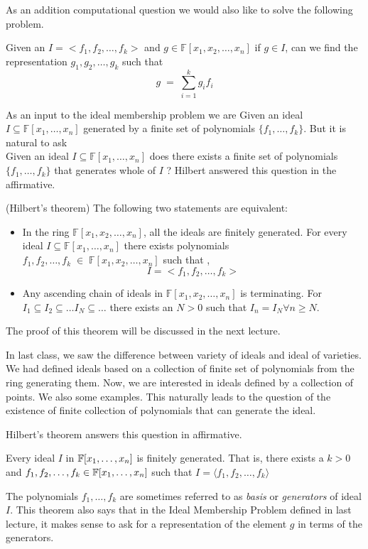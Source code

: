 As an addition computational question we would also like to solve the following problem.


Given an $I = <f_1,f_2, \ldots, f_k>$ and $g \in \mathbb{F}[x_1,x_2,\ldots,x_n]$ if $g\in I$, can we find the representation $g_1,g_2,\ldots,g_k$ such that $$
	g\;=\;\sum_{i=1}^k g_if_i
$$

As an input to the ideal membership problem we are 
Given an ideal $I\subseteq\mathbb{F}[x_1,\ldots,x_n]$ generated by a finite set of polynomials $\{f_1,\ldots,f_k\}$. But it is natural to ask \\
Given an ideal $I\subseteq\mathbb{F}[x_1,\ldots,x_n]$ does there exists a finite set of polynomials $\{f_1,\ldots,f_k\}$ that generates whole of $I$ ? Hilbert answered this question in the affirmative.


\begin{theorem}(Hilbert's theorem)  \label{thm:ascending-chain-condition}
The following two statements are equivalent:
\begin{itemize}
\item In the ring $\mathbb{F}[x_1,x_2,\ldots,x_n]$, all the ideals are finitely generated. For every ideal $ I\subseteq \mathbb{F}[x_1,\ldots,x_n]$ there exists polynomials $f_1,f_2,\ldots,f_k\;\in\;\mathbb{F}[x_1,x_2,\ldots,x_n]$ 
such that ,$$I = <f_1,f_2,\ldots,f_k>$$
\item Any ascending chain of ideals in $\mathbb{F}[x_1,x_2,\ldots,x_n]$ is terminating. For $I_1 \subseteq I_2\subseteq\ldots I_N \subseteq \ldots$
there exists an $N > 0$ such that $I_n = I_N \forall n \geq N$.
\end{itemize}
\end{theorem}
The proof of this theorem will be discussed in the next lecture.

In last class, we saw the difference between variety of ideals and ideal of
varieties. We had defined ideals based on a collection of finite set of
polynomials from the ring generating them. Now, we are interested in
ideals defined by a collection of points. We also some examples. This
naturally leads to the question of the existence of finite collection of
polynomials that can generate the ideal.

Hilbert's theorem answers this question in affirmative.
\begin{theorem}
	Every ideal $I$ in ${\mathbb{F}}[x_1,\ldots,x_n]$ is finitely generated. That
	is, there exists a $k > 0$ and $f_1,f_2,\ldots,f_k \in
	{\mathbb{F}}[x_1,\ldots,x_n]$ such that $I = \langle f_1,f_2,\ldots,f_k \rangle
	$
	\label{thm:hbt}
\end{theorem}
The polynomials $f_1,\ldots,f_k$ are sometimes referred to as \emph{basis} or
\emph{generators} of ideal $I$. This theorem also says that in the Ideal
Membership Problem defined in last
lecture, it makes sense to ask for a representation of the element $g$ in
terms of the generators. 

